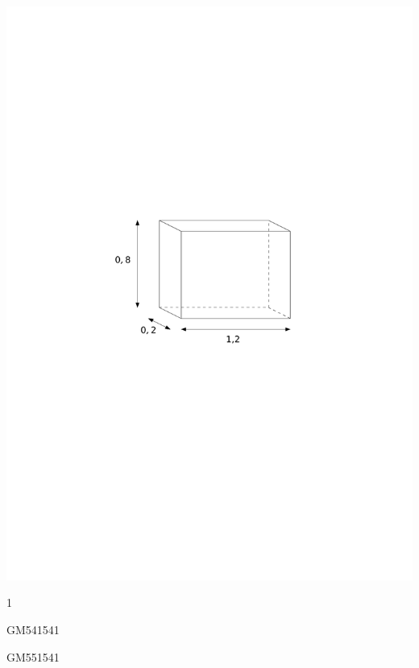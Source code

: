 \documentclass[a4paper,11pt]{report}
\begin{document}
\begin{exo}
{\begin{tasks}[after-item-skip = 0em]
    \task ~\\ \includegraphics[scale=0.5]{media/gm-02/pave4.pdf}
\end{tasks}
}{1}
\end{exo}

\begin{exol}{GM54}{154}{1}
\end{exol}
\begin{exol}{GM55}{154}{1}
\end{exol}
\end{document}
